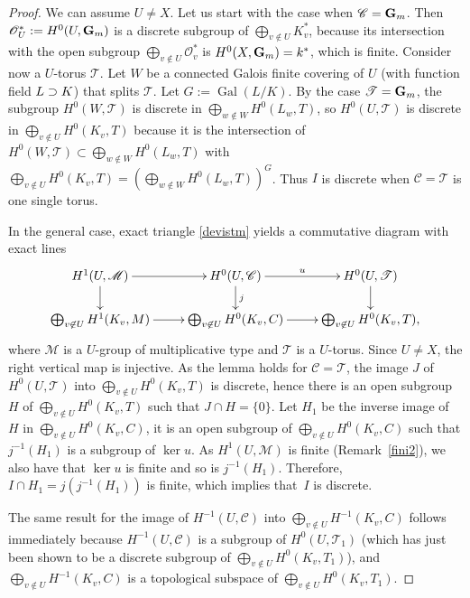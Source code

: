 \documentclass[11pt]{article}
\let\mathcal\mathscr
\theoremstyle{plain}
\theoremstyle{definition}
\DeclareMathOperator \gal {Gal}
\newcommand\cO {\mathcal{O}}
\newcommand \cT {\mathcal{T}}
\newcommand \cC {\mathcal{C}}
\begin{document}
\begin{proof} We can assume $U \neq X$. Let us start with the case
when $\cC=\G$.
Then $\cO_U ^*:=H^0(U,\G)$ is a discrete subgroup of $\bigoplus
_{v \not \in U} K_v^*$, because its intersection with the open subgroup
$\bigoplus_{v \not \in U} \cO_v^*$ is $H^0(X,\mathbf{G}_m)=k^*$, which is finite.
Consider now a $U$\nobreakdash-torus $\cT$. Let $W$ be a connected Galois
finite covering of $U$ (with function field $L \supset\nobreak K$)
that splits $\cT$. Let $G:=\gal(L/K)$.
By the case $\cT=\G$, the subgroup $H^0(W,\cT)$ is discrete
in $\bigoplus_{w \not \in W} H^0(L_w,T)$, so $H^0(U,\cT)$ is discrete
in $\bigoplus_{v \not \in U} H^0(K_v,T)$ because it is the intersection
of $H^0(W,\cT) \subset \bigoplus_{w \not \in W} H^0(L_w,T)$ with
$\bigoplus_{v \not \in U} H^0(K_v,T)=(\bigoplus_{w \not \in W} H^0(L_w,T))^G$.
Thus $I$ is discrete when $\cC=\cT$ is one single torus.

In the general case, exact triangle \eqref{devistm} yields a commutative
diagram with exact lines\vspace*{-8pt}
\[
\xymatrix@R=6mm{
H^1(U,\mathcal M) \ar[r]\ar[d]& H^0(U,\cC)\ar[r]^-u\ar[d]^j& H^0(U,\cT)\ar[d]\\
\bigoplus_{v \not \in U} H^1(K_v,M) \ar[r]& \bigoplus_{v \not \in U}
H^0(K_v,C) \ar[r]& \bigoplus_{v \not \in U} H^0(K_v,T),
}
\]
where $\mathcal M$ is a $U$-group of multiplicative type and $\cT$
is a $U$-torus. Since $U \neq X$, the right vertical map
is injective. As the lemma holds for $\cC=\cT$,
the image $J$ of $H^0(U,\cT)$ into
$\bigoplus_{v \not \in U} H^0(K_v,T)$ is discrete,
hence there is an open subgroup $H$ of $\bigoplus_{v \not \in U} H^0(K_v,T)$
such that $J \cap H=\{0\}$. Let $H_1$ be the inverse image of $H$ in
$\bigoplus_{v \not \in U} H^0(K_v,C)$, it is an open subgroup of
$\bigoplus_{v \not \in U} H^0(K_v,C)$ such
that $j^{-1}(H_1)$ is a subgroup of $\ker u$. As
$H^1(U,\mathcal M)$ is finite (Remark~\ref{fini2}), we also have that
$\ker u$ is finite and so is $j^{-1}(H_1)$. Therefore, $I \cap H_1
=j(j^{-1}(H_1))$ is finite, which implies that~$I$ is discrete.

The same result for the image of $H^{-1}(U,\cC)$ into $\bigoplus_{v \not \in U}
H^{-1}(K_v,C)$ follows immediately because $H^{-1}(U,\cC)$ is a subgroup
of $H^0(U,\cT_1)$ (which has just been shown to be a discrete subgroup
of $\bigoplus_{v \not \in U} H^0(K_v,T_1)$), and $\bigoplus_{v \not \in U}
H^{-1}(K_v,C)$ is a topological subspace of
$\bigoplus_{v \not \in U} H^0(K_v,T_1)$.
\end{proof}
\end{document}
